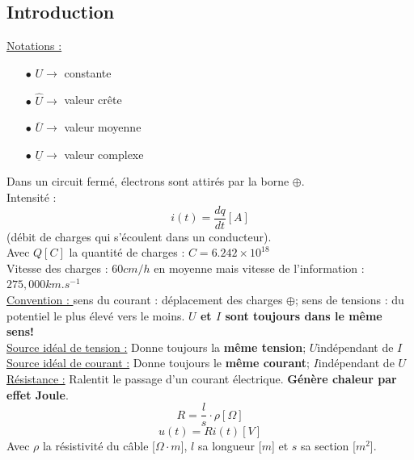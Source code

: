 \documentclass[../main.tex]{subfiles}
\begin{document}
\localtableofcontents
\subsection{Introduction}
\quad \underline{Notations :} 
\begin{itemize}
    \item[$\bullet$] $U\rightarrow$ constante\\
    \item[$\bullet$] $\hat{U} \rightarrow$ valeur crête\\
    \item[$\bullet$] $\overline{U} \rightarrow$ valeur moyenne\\
    \item[$\bullet$] $\underline{U} \rightarrow$ valeur complexe\\
\end{itemize}
\quad Dans un circuit fermé, électrons sont attirés par la borne $\oplus$.\\
Intensité : 
\begin{equation}
    i(t) = \frac{dq}{dt}[A]
\end{equation} (débit de charges qui s'écoulent dans un conducteur). \\Avec $Q [C]$ la quantité de charges : \textbf{$C = 6.242\times10^{18}$}\\

\quad Vitesse des charges : $60cm/h$ en moyenne mais vitesse de l'information : $275,000km.s^{-1}$\\

\quad \underline{Convention : } sens du courant : déplacement des charges $\oplus$;
sens de tensions : du potentiel le plus élevé vers le moins. \textbf{$U$ et $I$ sont toujours dans le même sens!}\\

\quad \underline{Source idéal de tension :} Donne toujours la \textbf{même tension};
$U$indépendant de $I$\\

\quad \underline{Source idéal de courant :} Donne toujours le \textbf{même courant};
$I$indépendant de $U$\\

\quad \underline{Résistance :} Ralentit le passage d'un courant électrique. \textbf{Génère chaleur par effet Joule}.
\begin{equation}
    R = \frac{l}{s}\cdot \rho [\Omega]
\end{equation}
\begin{equation}
    u(t) = Ri(t)[V]
\end{equation}
Avec $\rho$ la résistivité du câble [$\Omega\cdot m$], $l$ sa longueur [$m$] et $s$ sa section [$m^2$].\\
\end{document}
